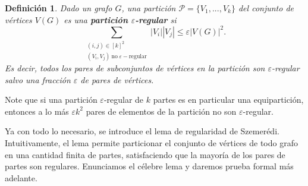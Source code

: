 \documentclass{article}[14pts]
\newcommand{\hh}[1]{{\color{red} * #1 *}}
\newtheorem{definicion}{Definición}
\let\varepsilon=\varepsilon
\begin{document}
\begin{definicion}
    Dado un grafo $G$, una partición $\mathcal{P} = \lbrace V_1,...,V_{k}\rbrace$ del conjunto de vértices $V(G)$ es una \textbf{partición $\varepsilon$-regular} si 
    \[
    \sum_{\substack{ (i,j)\in [k]^{2} \\ (V_{i}, V_{j})\ \mathrm{no}\ \varepsilon-\mathrm{regular}}} |V_i||V_j| \leq \varepsilon |V(G)|^{2}.
    \]
    Es decir, todos los pares de subconjuntos de vértices en la partición son $\varepsilon$-regular salvo una fracción $\varepsilon$ de pares de vértices.

\end{definicion}\medskip

Note que si una partición $\varepsilon$-regular de $k$ partes es en particular una equipartición, entonces a lo más $\varepsilon k^{2}$ pares de elementos de la partición no son $\varepsilon$-regular.\medskip

Ya con todo lo necesario, se introduce el lema de regularidad de Szemerédi. Intuitivamente, el lema permite particionar el conjunto de vértices de todo grafo en una cantidad finita de partes, satisfaciendo que la mayoría de los pares de partes son regulares. Enunciamos el célebre lema y daremos prueba formal más adelante.\medskip
\end{document}
